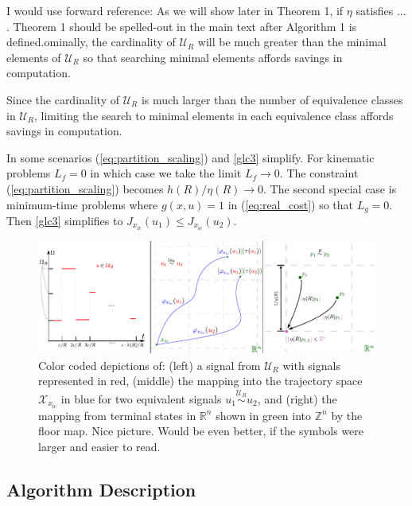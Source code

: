 \documentclass{llncs}
\newcommand{\mcmargin}[2]{{\color{red}#1}\marginpar{\raggedright\footnotesize\color{red}[MC] #2}}
\begin{document}
\mcmargin{I would use forward reference: As we will show later in Theorem 1, if $\eta$ satisfies ... . }{}
\mcmargin{Theorem 1 should be spelled-out in the main text after Algorithm 1 is defined.}


%
Nominally, the cardinality of $\mathcal{U}_R$ will be much greater than the minimal elements of $\mathcal{U}_R$ so that searching minimal elements affords savings in computation.

\mcmargin{Since the cardinality of $\mathcal{U}_R$ is much larger than the number of equivalence classes in $\mathcal{U}_R$, limiting the search to minimal elements in each equivalence class affords savings in computation.}{}

%  



In some scenarios (\ref{eq:partition_scaling}) and \ref{glc3} simplify.
%
For kinematic problems $L_{f}=0$ in which case we take the limit $L_{f}\rightarrow 0$. The constraint (\ref{eq:partition_scaling}) becomes $h(R)/\eta(R)\rightarrow 0$.
%
The second special case is minimum-time problems where $g(x,u)=1$ in (\ref{eq:real_cost}) so that $L_{g}=0$. 
%
Then \ref{glc3} simplifies to $J_{x_\mathrm{ic}}(u_{1}) \leq J_{x_\mathrm{ic}}(u_{2})$.

\begin{figure}[htb]
\centering{}\includegraphics[width=1\textwidth]{Graphics/Theory_Intuition/intuition}
\caption{\label{fig:intuition} Color coded depictions of: (left) a signal from $\mathcal{U}_R$ with signals represented in red, (middle) the mapping into the trajectory space $\mathcal{X}_{x_\mathrm{ic}}$ in blue for two equivalent signals $u_1 \overset{\mathcal{U}_R}{\sim}u_2$, and (right) the mapping from terminal states in $\mathbb{R}^n$ shown in green into $\mathbb{Z}^n$ by the floor map. {\color{red} Nice picture. Would be even better, if the symbols were larger and easier to read.}}
\end{figure}

\subsection{Algorithm Description} 
\end{document}
